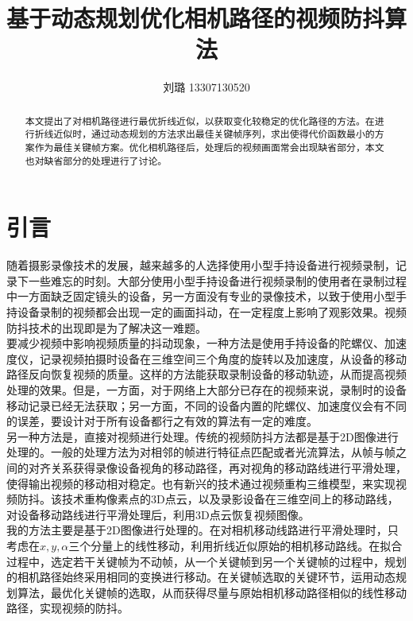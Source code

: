 \documentclass[journal, a4paper]{IEEEtran}
\begin{document}
  \title{基于动态规划优化相机路径的视频防抖算法}
  \author{刘璐 13307130520}
  \maketitle
    
\begin{abstract}
  本文提出了对相机路径进行最优折线近似，以获取变化较稳定的优化路径的方法。在进行折线近似时，通过动态规划的方法求出最佳关键帧序列，求出使得代价函数最小的方案作为最佳关键帧方案。优化相机路径后，处理后的视频画面常会出现缺省部分，本文也对缺省部分的处理进行了讨论。
\end{abstract}

\section{引言}
  随着摄影录像技术的发展，越来越多的人选择使用小型手持设备进行视频录制，记录下一些难忘的时刻。大部分使用小型手持设备进行视频录制的使用者在录制过程中一方面缺乏固定镜头的设备，另一方面没有专业的录像技术，以致于使用小型手持设备录制的视频都会出现一定的画面抖动，在一定程度上影响了观影效果。视频防抖技术的出现即是为了解决这一难题。 \\
    
  要减少视频中影响视频质量的抖动现象，一种方法是使用手持设备的陀螺仪、加速度仪，记录视频拍摄时设备在三维空间三个角度的旋转以及加速度，从设备的移动路径反向恢复视频的质量。这样的方法能获取录制设备的移动轨迹，从而提高视频处理的效果\cite{GYR1}\cite{GYR2}。但是，一方面，对于网络上大部分已存在的视频来说，录制时的设备移动记录已经无法获取；另一方面，不同的设备内置的陀螺仪、加速度仪会有不同的误差，要设计对于所有设备都行之有效的算法有一定的难度。\\
  
    另一种方法是，直接对视频进行处理。传统的视频防抖方法都是基于2D图像进行处理的。一般的处理方法为对相邻的帧进行特征点匹配或者光流算法，从帧与帧之间的对齐关系获得录像设备视角的移动路径，再对视角的移动路线进行平滑处理，使得输出视频的移动相对稳定\cite{L1Opt}。也有新兴的技术通过视频重构三维模型，来实现视频防抖。该技术重构像素点的3D点云，以及录影设备在三维空间上的移动路线，对设备移动路线进行平滑处理后，利用3D点云恢复视频图像\cite{FLiu1}\cite{FLiu2}。 \\
    
    我的方法主要是基于2D图像进行处理的。在对相机移动线路进行平滑处理时，只考虑在$x,y,\alpha$三个分量上的线性移动，利用折线近似原始的相机移动路线。在拟合过程中，选定若干关键帧为不动帧，从一个关键帧到另一个关键帧的过程中，规划的相机路径始终采用相同的变换进行移动。在关键帧选取的关键环节，运用动态规划算法，最优化关键帧的选取，从而获得尽量与原始相机移动路径相似的线性移动路径，实现视频的防抖。
\end{document}
